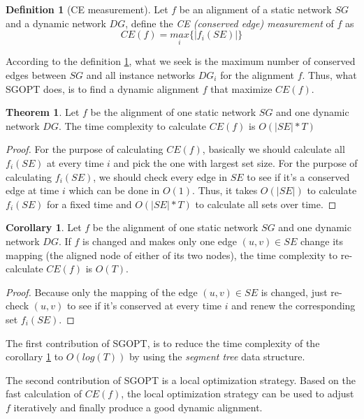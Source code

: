 \documentclass{bioinfo}
\theoremstyle{definition}
\newtheorem{thm}{\textbf{Theorem}}[section]%
\newtheorem{cor}{\textbf{Corollary}}[thm]%
\newtheorem{defn}{\textbf{Definition}}[section]%
\begin{document}
\begin{methods}
\begin{defn}[CE measurement]
\label{defnce}
Let $f$ be an alignment of a static network $SG$ and a dynamic network $DG$, define the \textit{CE (conserved edge) measurement} of $f$ as 
$$CE(f)=\underset{i}{max}\{ |f_i(SE)|\}$$
\end{defn}

According to the definition \ref{defnce}, what we seek is the maximum number of conserved edges between $SG$ and all instance networks $DG_i$ for the alignment $f$. Thus, what SGOPT does, is to find a dynamic alignment $f$ that maximize $CE(f)$.

\begin{thm}
Let $f$ be the alignment of one static network $SG$ and one dynamic network $DG$. The time complexity to calculate $CE(f)$ is $O(|SE|*T)$
\end{thm}
\begin{proof}
For the purpose of calculating $CE(f)$, basically we should calculate all $f_i(SE)$ at every time $i$ and pick the one with largest set size. For the purpose of calculating $f_i(SE)$, we should check every edge in $SE$ to see if it's a conserved edge at time $i$ which can be done in $O(1)$. Thus, it takes $O(|SE|)$ to calculate $f_i(SE)$ for a fixed time and $O(|SE|*T)$ to calculate all sets over time. 
\end{proof}
\begin{cor}
\label{corsingleforce}
Let $f$ be the alignment of one static network $SG$ and one dynamic network $DG$. If $f$ is changed and makes only one edge $(u,v)\in SE$ change its mapping (the aligned node of either of its two nodes), the time complexity to re-calculate $CE(f)$ is $O(T)$. 
\end{cor}
\begin{proof}
Because only the mapping of the edge $(u,v)\in SE$ is changed, just re-check $(u,v)$ to see if it's conserved at every time $i$ and renew the corresponding set $f_i(SE)$.
\end{proof}
The first contribution of SGOPT, is to reduce the time complexity of the corollary \ref{corsingleforce} to $O(log(T))$ by using the \textit{segment tree} data structure.

The second contribution of SGOPT is a local optimization strategy. Based on the fast calculation of $CE(f)$, the local optimization strategy can be used to adjust $f$ iteratively and finally produce a good dynamic alignment.


\end{methods}
\end{document}
